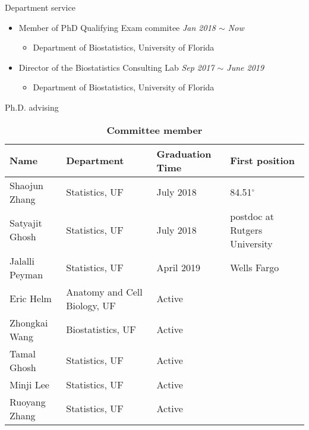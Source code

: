 \documentclass{resume} %
\begin{document}
\begin{rSection}{Department service}
\begin{itemize}[noitemsep,topsep=0pt]

\item Member of PhD Qualifying Exam commitee 
        \hfill {\em Jan 2018 $\sim$ Now} 
        \begin{itemize}
        \item Department of Biostatistics, University of Florida
        \end{itemize}

\item Director of the Biostatistics Consulting Lab
        \hfill {\em Sep 2017 $\sim$ June 2019} 
        \begin{itemize}
        \item Department of Biostatistics, University of Florida
        \end{itemize}


\end{itemize}
\end{rSection}


\begin{rSection}{Ph.D. advising}

\begin{table}[htp]
\caption*{\textbf{Committee member}}
\begin{center}
\begin{tabular}{l l l l}
\hline
\hline
Name & Department & Graduation Time & First position \\
\hline
Shaojun Zhang & Statistics, UF & July 2018 & 84.51$^\circ$ \\
Satyajit Ghosh & Statistics, UF & July 2018 & postdoc at Rutgers University \\
Jalalli Peyman & Statistics, UF & April 2019 & Wells Fargo \\
Eric Helm &  Anatomy and Cell Biology, UF & Active & \\
Zhongkai Wang &  Biostatistics, UF & Active & \\
Tamal Ghosh & Statistics, UF & Active & \\
Minji Lee & Statistics, UF & Active & \\
Ruoyang Zhang & Statistics, UF & Active & \\
\hline
\hline
\end{tabular}
\end{center}
\label{default}
\end{table}%

\end{rSection}
\end{document}
